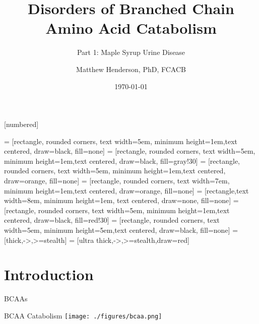 \documentclass[presentation, smaller]{beamer}
\author{Matthew Henderson, PhD, FCACB}
\date{\today}
\title{Disorders of Branched Chain Amino Acid Catabolism}
\subtitle{Part 1: Maple Syrup Urine Disease}
\institute[NSO]{Newborn Screening Ontario | The University of Ottawa}
\begin{document}
\maketitle

\vspace{220pt}
\beamertemplatenavigationsymbolsempty
{}[numbered]

 = [rectangle, rounded corners, text width=5em, minimum height=1em,text centered, draw=black, fill=none]
 = [rectangle, rounded corners, text width=5em, minimum height=1em,text centered, draw=black, fill=gray!30]
 = [rectangle, rounded corners, text width=5em, minimum height=1em,text centered, draw=orange, fill=none]
 = [rectangle, rounded corners, text width=7em, minimum height=1em,text centered, draw=orange, fill=none]
 = [rectangle,text width=8em, minimum height=1em, text centered, draw=none, fill=none]
 = [rectangle, rounded corners, text width=5em, minimum height=1em,text centered, draw=black, fill=red!30]
 = [rectangle, rounded corners, text width=5em, minimum height=5em,text centered, draw=black, fill=none]
 = [thick,->,>=stealth]
 = [ultra thick,->,>=stealth,draw=red]

\section{Introduction}
\label{sec:orgheadline3}
\begin{frame}[label={sec:orgheadline1}]{BCAAs}
\centering
{}
\end{frame}

\begin{frame}[label={sec:orgheadline2}]{BCAA Catabolism}
\centering
\texttt{[image: ./figures/bcaa.png]}
\end{frame}
\end{document}
